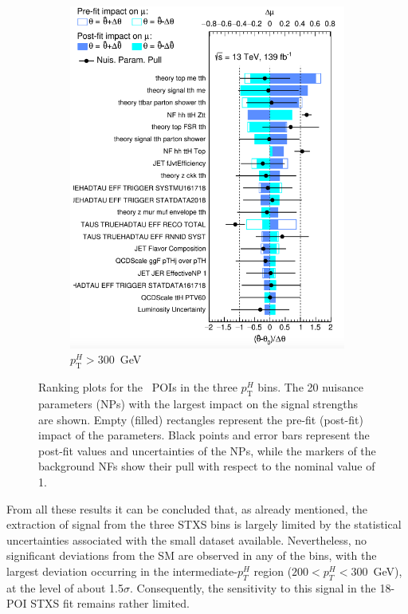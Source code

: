 \begin{figure}[htbp]
  \vspace{0.4cm}
  \begin{subfigure}[b]{0.45\textwidth}
    \centering
    \includegraphics[width=\linewidth]{images/fit_stxs/Ranking_r_11_ttH_ptH_gt300.png}
    \caption{\small $p_{\text{T}}^{H}>300$~GeV}
    \label{fig:ranking_tth_ptH_gt300}
  \end{subfigure}

  \caption{Ranking plots for the \ttH\ POIs in the three $p_{\text{T}}^{H}$ bins.
  The 20 nuisance parameters (NPs) with the largest impact on the signal strengths are shown. 
  Empty (filled) rectangles represent the pre-fit (post-fit) impact of the parameters. 
  Black points and error bars represent the post-fit values and uncertainties of the NPs, 
  while the markers of the background NFs show their pull with respect to the nominal value of 1.}
  \label{fig:ranking_tth_bins}
\end{figure}

From all these results it can be concluded that, as already mentioned, the extraction of signal from the three STXS bins is largely limited by the statistical uncertainties associated with the small dataset available. Nevertheless, no significant deviations from the SM are observed in any of the bins, with the largest deviation occurring in the intermediate-$p_{T}^{H}$ region ($200 < p_{T}^{H} < 300$~GeV), at the level of about 1.5$\sigma$. Consequently, the sensitivity to this signal in the 18-POI STXS fit remains rather limited.

